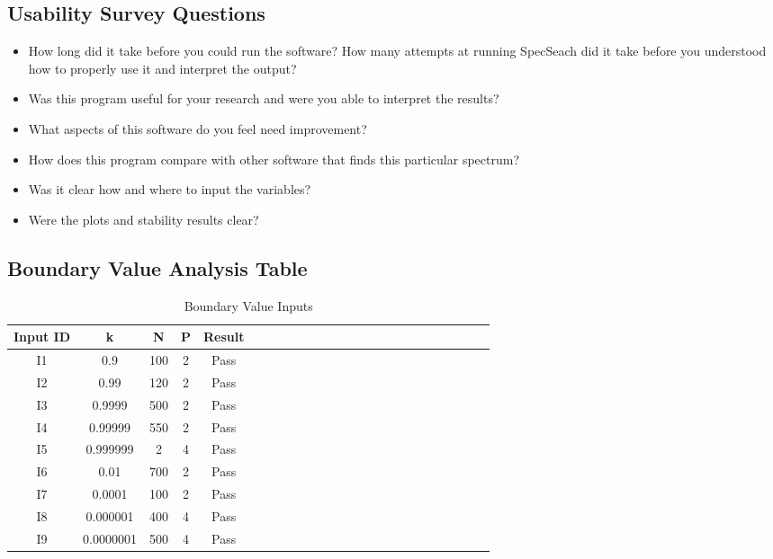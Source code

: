 \documentclass[12pt, titlepage]{article}
\begin{document}
\subsection{Usability Survey Questions}
\label{UsabilitySurvey}
\begin{itemize}
	\item How long did it take before you could run the software? How many 
	attempts at running SpecSeach did it take before you understood how to 
	properly use it and interpret the output?
	\item Was this program useful for your research and were you able to 
	interpret the results? 
	\item What aspects of this software do you feel need improvement?
	\item How does this program compare with other software that finds this 
	particular spectrum? 
	\item Was it clear how and where to input the variables? 
	\item Were the plots and stability results clear? 
\end{itemize}  

\clearpage
\subsection{Boundary Value Analysis Table}
\begin{table}[h!]
	\centering
	\begin{tabular}{|c|c|c|c|c|c|c|c|c|c|c|c|c|c|c|c|c|c|c|c|c|c|c|c|}
		\hline        
		Input ID& k& N & P & Result \\
		\hline
		I1      &0.9 &100 &2 & Pass \\ \hline
		I2     &0.99 &120 &2 & Pass \\ \hline
		I3     &0.9999 &500 &2 & Pass\\ \hline 
		I4     &0.99999 &550 &2 & Pass \\ \hline 
		I5      &0.999999 &2 &4 & Pass \\ \hline
		I6     &0.01 &700 & 2& Pass \\ \hline
		I7    &0.0001 &100 & 2& Pass\\ \hline 
		I8     &0.000001 &400 &4& Pass \\ \hline
		I9      &0.0000001 &500 &4 & Pass \\ 
		\hline
	\end{tabular}\\
	\caption{Boundary Value Inputs}
	\label{Table:D_13}
\end{table} 
\end{document}
